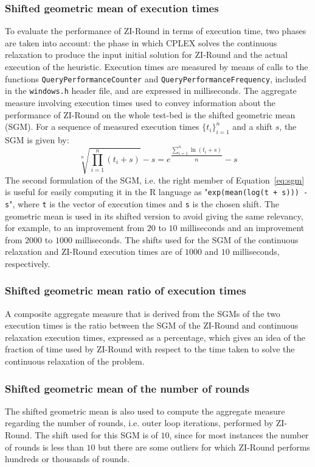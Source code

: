 \documentclass[a4paper,12pt,twoside]{scrbook}
\begin{document}
\subsubsection{Shifted geometric mean of execution times}
To evaluate the performance of ZI-Round in terms of execution time, two phases are taken into account: the phase in which CPLEX solves the continuous relaxation to produce the input initial solution for ZI-Round and the actual execution of the heuristic. Execution times are measured by means of calls to the functions \texttt{QueryPerformanceCounter} and \texttt{QueryPerformanceFrequency}, included in the \texttt{windows.h} header file, and are expressed in milliseconds. The aggregate measure involving execution times used to convey information about the performance of ZI-Round on the whole test-bed is the shifted geometric mean (SGM). 
For a sequence of measured execution times $\{t_i\}_{i=1}^{n}$ and a shift $s$, the SGM is given by:
\begin{equation}\label{eq:sgm}
	\sqrt[n]{\prod_{i=1}^{n}(t_i+s)} - s = e^{\dfrac{\sum_{i=1}^{n}\ln(t_i+s)}{n}}-s
\end{equation}
The second formulation of the SGM, i.e. the right member of Equation~\ref{eq:sgm} is useful for easily computing it in the R language as "\texttt{exp(mean(log(t + s))) - s}", where \texttt{t} is the vector of execution times and \texttt{s} is the chosen shift.
The geometric mean is used in its shifted version to avoid giving the same relevancy, for example, to an improvement from $20$ to $10$ milliseconds and an improvement from $2000$ to $1000$ milliseconds.
The shifts used for the SGM of the continuous relaxation and ZI-Round execution times are of $1000$ and $10$ milliseconds, respectively. \par 
\subsubsection{Shifted geometric mean ratio of execution times}
A composite aggregate measure that is derived from the SGMs of the two execution times is the ratio between the SGM of the ZI-Round and continuous relaxation execution times, expressed as a percentage, which gives an idea of the fraction of time used by ZI-Round with respect to the time taken to solve the continuous relaxation of the problem.
\subsubsection{Shifted geometric mean of the number of rounds}
The shifted geometric mean is also used to compute the aggregate measure regarding the number of rounds, i.e. outer loop iterations, performed by ZI-Round. The shift used for this SGM is of $10$, since for most instances the number of rounds is less than $10$ but there are some outliers for which ZI-Round performs hundreds or thousands of rounds.
\end{document}
